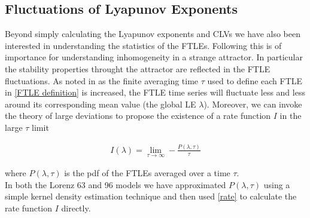 \subsection{Fluctuations of Lyapunov Exponents} \label{section: FTLE-Fluctuations}

Beyond simply calculating the Lyapunov exponents and CLVs we have also been interested in understanding the statistics of the FTLEs. Following \cite{Politi2014} this is of importance for understanding inhomogeneity in a strange attractor. In particular the stability properties throught the attractor are reflected in the FTLE fluctuations. As noted in \cite{Politi2014} as the finite averaging time $\tau$ used to define each FTLE in \ref{FTLE definition} is increased, the FTLE time series will fluctuate less and less around its corresponding mean value (the global LE $\lambda$). Moreover, we can invoke the theory of large deviations to propose the existence of a rate function $I$ in the large $\tau$ limit

\begin{align}
    I(\lambda) = \lim _{\tau \to \infty} - \frac{P(\lambda, \tau)}{\tau} \label{rate}
\end{align}

where $P(\lambda, \tau)$ is the pdf of the FTLEs averaged over a time $\tau$.\\

In both the Lorenz 63 and 96 models we have approximated $P(\lambda, \tau)$ using a simple kernel density estimation technique and then used \ref{rate} to calculate the rate function $I$ directly.
